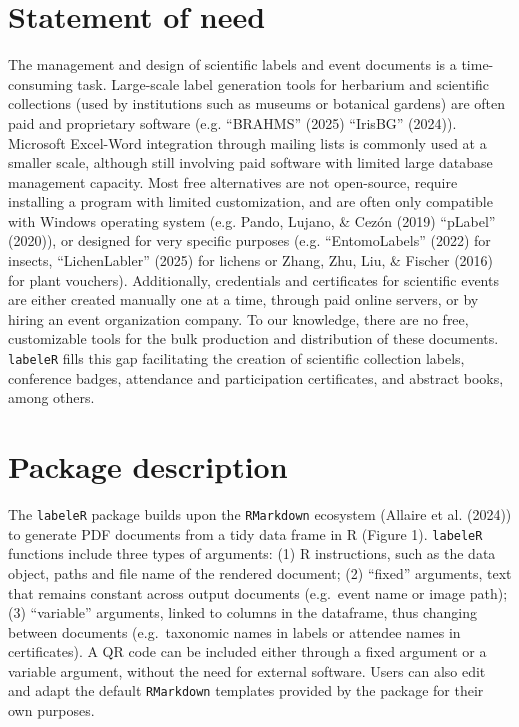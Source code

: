\documentclass[10pt,a4paper,onecolumn]{article}
\begin{document}
\section{Statement of need}\label{statement-of-need}

The management and design of scientific labels and event documents is a
time-consuming task. Large-scale label generation tools for herbarium
and scientific collections (used by institutions such as museums or
botanical gardens) are often paid and proprietary software (e.g.
{``BRAHMS''} (2025) {``IrisBG''} (2024)). Microsoft Excel-Word
integration through mailing lists is commonly used at a smaller scale,
although still involving paid software with limited large database
management capacity. Most free alternatives are not open-source, require
installing a program with limited customization, and are often only
compatible with Windows operating system (e.g. Pando, Lujano, \& Cezón
(2019) {``pLabel''} (2020)), or designed for very specific purposes
(e.g. {``EntomoLabels''} (2022) for insects, {``LichenLabler''} (2025)
for lichens or Zhang, Zhu, Liu, \& Fischer (2016) for plant vouchers).
Additionally, credentials and certificates for scientific events are
either created manually one at a time, through paid online servers, or
by hiring an event organization company. To our knowledge, there are no
free, customizable tools for the bulk production and distribution of
these documents. \texttt{labeleR} fills this gap facilitating the
creation of scientific collection labels, conference badges, attendance
and participation certificates, and abstract books, among others.

\section{Package description}\label{package-description}

The \texttt{labeleR} package builds upon the \texttt{RMarkdown}
ecosystem (Allaire et al. (2024)) to generate PDF documents from a tidy
data frame in R (Figure 1). \texttt{labeleR} functions include three
types of arguments: (1) R instructions, such as the data object, paths
and file name of the rendered document; (2) ``fixed'' arguments, text
that remains constant across output documents (e.g.~event name or image
path); (3) ``variable'' arguments, linked to columns in the dataframe,
thus changing between documents (e.g.~taxonomic names in labels or
attendee names in certificates). A QR code can be included either
through a fixed argument or a variable argument, without the need for
external software. Users can also edit and adapt the default
\texttt{RMarkdown} templates provided by the package for their own
purposes.
\end{document}
